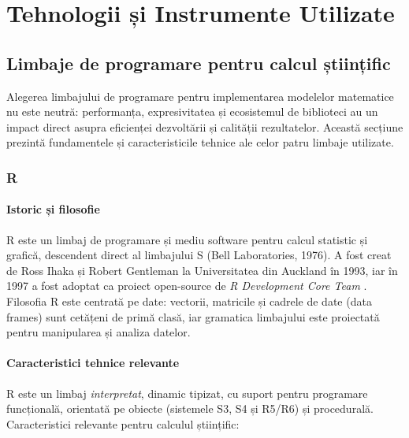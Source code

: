 
\chapter{Tehnologii și Instrumente Utilizate}
\label{ch:tehnologii}

\section{Limbaje de programare pentru calcul științific}
\label{sec:limbaje}

Alegerea limbajului de programare pentru implementarea modelelor matematice
nu este neutră: performanța, expresivitatea și ecosistemul de biblioteci
au un impact direct asupra eficienței dezvoltării și calității rezultatelor.
Această secțiune prezintă fundamentele și caracteristicile tehnice ale
celor patru limbaje utilizate.

\subsection{R}
\label{subsec:r}

\subsubsection{Istoric și filosofie}

R este un limbaj de programare și mediu software pentru calcul statistic și
grafică, descendent direct al limbajului S (Bell Laboratories, 1976). A fost
creat de Ross Ihaka și Robert Gentleman la Universitatea din Auckland în 1993,
iar în 1997 a fost adoptat ca proiect open-source de \emph{R Development Core
Team} \cite{rcoreteam2024}. Filosofia R este centrată pe date: vectorii,
matricile și cadrele de date (data frames) sunt cetățeni de primă clasă,
iar gramatica limbajului este proiectată pentru manipularea și analiza datelor.

\subsubsection{Caracteristici tehnice relevante}

R este un limbaj \emph{interpretat}, dinamic tipizat, cu suport pentru
programare funcțională, orientată pe obiecte (sistemele S3, S4 și R5/R6)
și procedurală. Caracteristici relevante pentru calculul științific:


